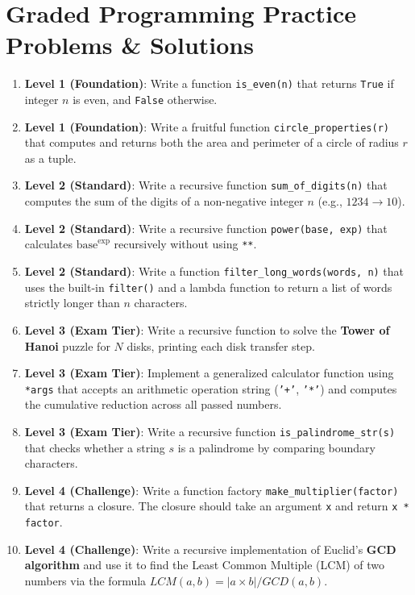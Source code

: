\section{Graded Programming Practice Problems \& Solutions}

\begin{practiceset}
\begin{enumerate}[leftmargin=1.5em]
    \item \textbf{Level 1 (Foundation)}: Write a function \texttt{is\_even(n)} that returns \texttt{True} if integer $n$ is even, and \texttt{False} otherwise.
    \item \textbf{Level 1 (Foundation)}: Write a fruitful function \texttt{circle\_properties(r)} that computes and returns both the area and perimeter of a circle of radius $r$ as a tuple.
    \item \textbf{Level 2 (Standard)}: Write a recursive function \texttt{sum\_of\_digits(n)} that computes the sum of the digits of a non-negative integer $n$ (e.g., $1234 \to 10$).
    \item \textbf{Level 2 (Standard)}: Write a recursive function \texttt{power(base, exp)} that calculates $\text{base}^{\text{exp}}$ recursively without using \texttt{**}.
    \item \textbf{Level 2 (Standard)}: Write a function \texttt{filter\_long\_words(words, n)} that uses the built-in \texttt{filter()} and a lambda function to return a list of words strictly longer than $n$ characters.
    \item \textbf{Level 3 (Exam Tier)}: Write a recursive function to solve the \textbf{Tower of Hanoi} puzzle for $N$ disks, printing each disk transfer step.
    \item \textbf{Level 3 (Exam Tier)}: Implement a generalized calculator function using \texttt{*args} that accepts an arithmetic operation string (\texttt{'+'}, \texttt{'*'}) and computes the cumulative reduction across all passed numbers.
    \item \textbf{Level 3 (Exam Tier)}: Write a recursive function \texttt{is\_palindrome\_str(s)} that checks whether a string $s$ is a palindrome by comparing boundary characters.
    \item \textbf{Level 4 (Challenge)}: Write a function factory \texttt{make\_multiplier(factor)} that returns a closure. The closure should take an argument \texttt{x} and return \texttt{x * factor}.
    \item \textbf{Level 4 (Challenge)}: Write a recursive implementation of Euclid's \textbf{GCD algorithm} and use it to find the Least Common Multiple (LCM) of two numbers via the formula $LCM(a,b) = |a \times b| / GCD(a,b)$.
\end{enumerate}
\end{practiceset}

